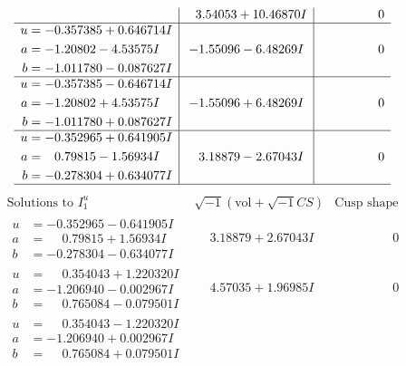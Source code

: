 \documentclass[1p]{elsarticle_modified}
\theoremstyle{definition}
\newcommand{\I}{\sqrt{-1}}
\begin{document}
$$\begin{array}{c|c|c}
 & \phantom{-}3.54053 + 10.46870 I & \phantom{-0.000000 } 0 \\ \hline\begin{aligned}
u &= -0.357385 + 0.646714 I \\
a &= -1.20802 - 4.53575 I \\
b &= -1.011780 - 0.087627 I\end{aligned}
 & -1.55096 - 6.48269 I & \phantom{-0.000000 } 0 \\ \hline\begin{aligned}
u &= -0.357385 - 0.646714 I \\
a &= -1.20802 + 4.53575 I \\
b &= -1.011780 + 0.087627 I\end{aligned}
 & -1.55096 + 6.48269 I & \phantom{-0.000000 } 0 \\ \hline\begin{aligned}
u &= -0.352965 + 0.641905 I \\
a &= \phantom{-}0.79815 - 1.56934 I \\
b &= -0.278304 + 0.634077 I\end{aligned}
 & \phantom{-}3.18879 - 2.67043 I & \phantom{-0.000000 } 0\\
 \hline 
 \end{array}$$\newpage$$\begin{array}{c|c|c}  
\text{Solutions to }I^u_{1}& \I (\text{vol} + \sqrt{-1}CS) & \text{Cusp shape}\\
 \hline 
\begin{aligned}
u &= -0.352965 - 0.641905 I \\
a &= \phantom{-}0.79815 + 1.56934 I \\
b &= -0.278304 - 0.634077 I\end{aligned}
 & \phantom{-}3.18879 + 2.67043 I & \phantom{-0.000000 } 0 \\ \hline\begin{aligned}
u &= \phantom{-}0.354043 + 1.220320 I \\
a &= -1.206940 - 0.002967 I \\
b &= \phantom{-}0.765084 - 0.079501 I\end{aligned}
 & \phantom{-}4.57035 + 1.96985 I & \phantom{-0.000000 } 0 \\ \hline\begin{aligned}
u &= \phantom{-}0.354043 - 1.220320 I \\
a &= -1.206940 + 0.002967 I \\
b &= \phantom{-}0.765084 + 0.079501 I\end{aligned}

\end{array}$$
\end{document}
